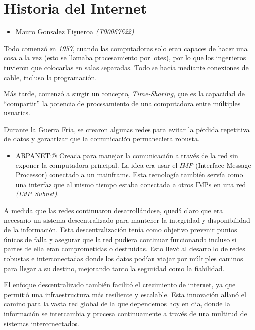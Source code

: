 \documentclass[letterpaper, 12pt]{article}
\begin{document}
\section*{Historia del Internet}

\begin{itemize}[label=$\triangleright$]
    \item Mauro Gonzalez Figueroa \textit{(T00067622)}
\end{itemize}

\nocite{*}

Todo comenzó en \textit{1957}, cuando las computadoras solo eran capaces de
hacer una cosa a la vez (esto se llamaba procesamiento por lotes), por lo que
los ingenieros tuvieron que colocarlas en salas separadas. Todo se hacía
mediante conexiones de cable, incluso la programación.

Más tarde, comenzó a surgir un concepto, \textit{Time-Sharing}, que es la
capacidad de ``compartir'' la potencia de procesamiento de una computadora
entre múltiples usuarios.

Durante la Guerra Fría, se crearon algunas redes para evitar la pérdida
repetitiva de datos y garantizar que la comunicación permaneciera robusta.

\begin{itemize}
    \item ARPANET:@{} Creada para manejar la comunicación a través de la red sin exponer
          la computadora principal. La idea era usar el \textit{IMP} (Interface Message
          Processor) conectado a un mainframe. Esta tecnología también servía como una
          interfaz que al mismo tiempo estaba conectada a otros IMPs en una red
          \textit{(IMP Subnet)}.
\end{itemize}

A medida que las redes continuaron desarrollándose, quedó claro que era
necesario un sistema descentralizado para mantener la integridad y
disponibilidad de la información. Esta descentralización tenía como objetivo
prevenir puntos únicos de falla y asegurar que la red pudiera continuar
funcionando incluso si partes de ella eran comprometidas o destruidas. Esto
llevó al desarrollo de redes robustas e interconectadas donde los datos podían
viajar por múltiples caminos para llegar a su destino, mejorando tanto la
seguridad como la fiabilidad.

El enfoque descentralizado también facilitó el crecimiento de internet, ya que
permitió una infraestructura más resiliente y escalable. Esta innovación allanó
el camino para la vasta red global de la que dependemos hoy en día, donde la
información se intercambia y procesa continuamente a través de una multitud de
sistemas interconectados.

\printbibliography
\end{document}

